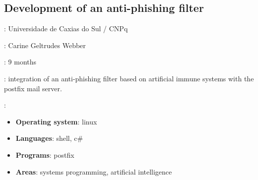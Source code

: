 \subsection*{Development of an anti-phishing filter}

\begin{description}[noitemsep]
    \item[Institution]: Universidade de Caxias do Sul / CNPq
    \item[Advisor]: Carine Geltrudes Webber
    \item[Duration]: 9 months
    \item[Attributions]:
        integration of an anti-phishing filter based on artificial immune
        systems with the postfix mail server.
    \item[Technologies]:
        \begin{itemize}[noitemsep]
            \item \textbf{Operating system}: linux
            \item \textbf{Languages}: shell, c\#
            \item \textbf{Programs}: postfix
            \item \textbf{Areas}: systems programming, artificial intelligence
        \end{itemize}
\end{description}
